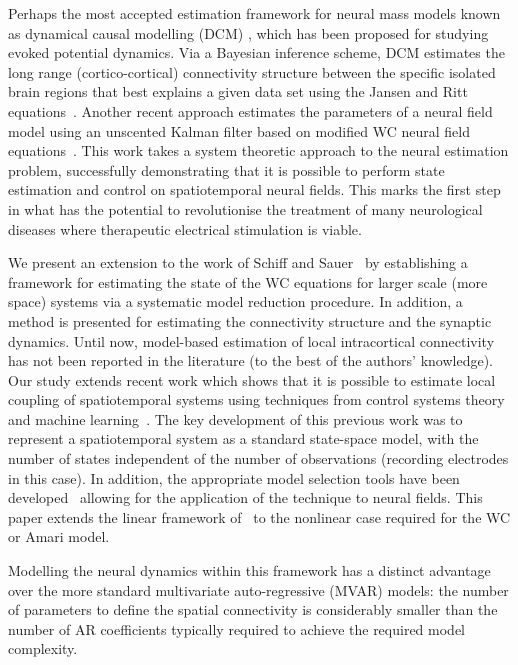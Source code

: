 \documentclass[12pt]{iopart}
\begin{document}
Perhaps the most accepted estimation framework for neural mass models known as dynamical causal modelling (DCM) \cite{David2003,David2006}, which has been proposed for studying evoked potential dynamics. Via a Bayesian inference scheme, DCM estimates the long range (cortico-cortical) connectivity structure between the specific isolated brain regions that best explains a given data set using the Jansen and Ritt equations~\cite{Jansen1995}. Another recent approach estimates the parameters of a neural field model using an unscented Kalman filter based on modified WC neural field equations~\cite{schiff2008kalman}. This work takes a system theoretic approach to the neural estimation problem, successfully demonstrating that it is possible to perform state estimation and control on spatiotemporal neural fields. This marks the first step in what has the potential to revolutionise the treatment of many neurological diseases where therapeutic electrical stimulation is viable.

We present an extension to the work of Schiff and Sauer~\cite{schiff2008kalman} by establishing a framework for estimating the state of the WC equations for larger scale (more space) systems via a systematic model reduction procedure. In addition, a method is presented for estimating the connectivity structure and the synaptic dynamics. Until now, model-based estimation of local intracortical connectivity has not been reported in the literature (to the best of the authors' knowledge). Our study extends recent work which shows that it is possible to estimate local coupling of spatiotemporal systems using techniques from control systems theory and machine learning~\cite{Dewar2009}. The key development of this previous work was to represent a spatiotemporal system as a standard state-space model, with the number of states independent of the number of observations (recording electrodes in this case). In addition, the appropriate model selection tools have been developed~\cite{Scerri2009} allowing for the application of the technique to neural fields. This paper extends the linear framework of~\cite{Dewar2009,Scerri2009} to the nonlinear case required for the WC or Amari model. 

Modelling the neural dynamics within this framework has a distinct advantage over the more standard multivariate auto-regressive (MVAR) models: the number of parameters to define the spatial connectivity is considerably smaller than the number of AR coefficients typically required to achieve the required model complexity. 
\end{document}
